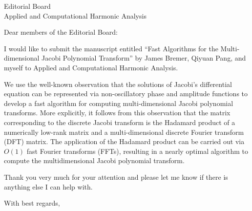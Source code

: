 \documentclass{letter}
\date{\today}
\begin{document}
\begin{letter}{
Editorial Board\\
Applied and Computational Harmonic Analysis
}

\opening{Dear members of the Editorial Board:}

I would like to submit the manuscript entitled
``Fast Algorithms for the Multi-dimensional Jacobi Polynomial Transform''
by James Bremer, Qiyuan Pang, and myself to Applied and Computational Harmonic Analysis.


We use the well-known observation that the solutions of Jacobi's differential 
equation can be represented via non-oscillatory phase and amplitude functions to develop 
 a fast algorithm for computing multi-dimensional Jacobi polynomial transforms.
More explicitly,  it  follows from this observation that the matrix corresponding to the 
discrete Jacobi transform is the Hadamard product of a 
numerically low-rank matrix and a multi-dimensional discrete Fourier transform (DFT) matrix.
The application of the Hadamard product can 
be carried out via $O(1)$ fast Fourier transforms (FFTs), resulting in a nearly optimal algorithm to compute the multidimensional Jacobi polynomial transform. 

Thank you very much for your attention and please let me know if
there is anything else I can help with.

\closing{With best regards,}

\end{letter}
\end{document}
